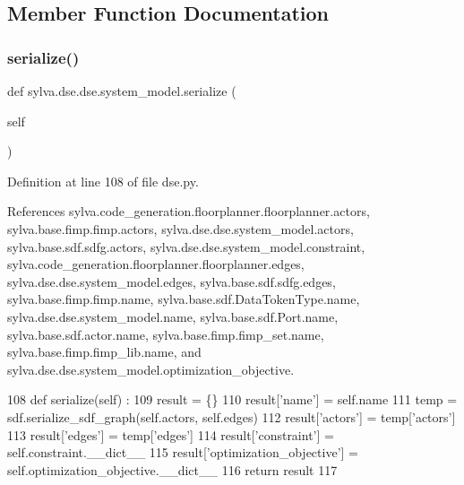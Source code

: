 \subsection{Member Function Documentation}
\mbox{\label{classsylva_1_1dse_1_1dse_1_1system__model_abdbd324e6d87f3baef25aeab12444edc}} 
\subsubsection{\texorpdfstring{serialize()}{serialize()}}
{\footnotesize\ttfamily def sylva.\+dse.\+dse.\+system\+\_\+model.\+serialize (\begin{DoxyParamCaption}\item[{}]{self }\end{DoxyParamCaption})}



Definition at line 108 of file dse.\+py.



References sylva.\+code\+\_\+generation.\+floorplanner.\+floorplanner.\+actors, sylva.\+base.\+fimp.\+fimp.\+actors, sylva.\+dse.\+dse.\+system\+\_\+model.\+actors, sylva.\+base.\+sdf.\+sdfg.\+actors, sylva.\+dse.\+dse.\+system\+\_\+model.\+constraint, sylva.\+code\+\_\+generation.\+floorplanner.\+floorplanner.\+edges, sylva.\+dse.\+dse.\+system\+\_\+model.\+edges, sylva.\+base.\+sdf.\+sdfg.\+edges, sylva.\+base.\+fimp.\+fimp.\+name, sylva.\+base.\+sdf.\+Data\+Token\+Type.\+name, sylva.\+dse.\+dse.\+system\+\_\+model.\+name, sylva.\+base.\+sdf.\+Port.\+name, sylva.\+base.\+sdf.\+actor.\+name, sylva.\+base.\+fimp.\+fimp\+\_\+set.\+name, sylva.\+base.\+fimp.\+fimp\+\_\+lib.\+name, and sylva.\+dse.\+dse.\+system\+\_\+model.\+optimization\+\_\+objective.


\begin{DoxyCode}
108   \textcolor{keyword}{def }serialize(self) :
109     result = \{\}
110     result[\textcolor{stringliteral}{'name'}] = self.name
111     temp = sdf.serialize\_sdf\_graph(self.actors, self.edges)
112     result[\textcolor{stringliteral}{'actors'}] = temp[\textcolor{stringliteral}{'actors'}]
113     result[\textcolor{stringliteral}{'edges'}] = temp[\textcolor{stringliteral}{'edges'}]
114     result[\textcolor{stringliteral}{'constraint'}] = self.constraint.\_\_dict\_\_
115     result[\textcolor{stringliteral}{'optimization\_objective'}] = self.optimization\_objective.\_\_dict\_\_
116     \textcolor{keywordflow}{return} result
117 
\end{DoxyCode}


